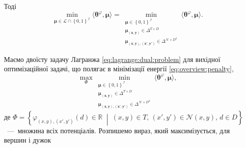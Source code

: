 Тоді
\begin{equation*}
    \min \limits_{\pmb{\mu} \in \mathcal{L} \cap \left\{0, 1 \right\}^{\mathcal{I}}}
        \langle \pmb{\theta}^{\varphi}, \pmb{\mu} \rangle =
    \min \limits_{\substack{\pmb{\mu} \in \left\{ 0, 1 \right\}^{\mathcal{I}} \\
                            \pmb{\mu_{\left(x, y \right)}} \in \Delta^{T \times D} \\
                            \pmb{\mu_{\left(x, y \right), \left(x', y' \right)}} \in
                                \Delta^{\mathcal{N} \times D^2}}}
        \langle \pmb{\theta}^{\varphi}, \pmb{\mu} \rangle.
\end{equation*}

Маємо двоїсту задачу Лагранжа \eqref{eq:lagrange:dual:problem}
для вихідної оптимізаційної задачі,
що полягає в мінімізації енергії \eqref{eq:overview:penalty},
\begin{equation*}
    \max \limits_{\Phi}
        \min \limits_{\substack{\pmb{\mu} \in \left\{ 0, 1 \right\}^{\mathcal{I}} \\
                                \pmb{\mu_{\left(x, y \right)}} \in \Delta^{T \times D} \\
                                \pmb{\mu_{\left(x, y \right), \left(x', y' \right)}} \in
                                    \Delta^{\mathcal{N} \times D^2}}}
            \langle \pmb{\theta}^{\varphi}, \pmb{\mu} \rangle,
\end{equation*}
де
$\Phi = \left\{
    \varphi_{\left(x, y \right), \left(x', y' \right)} \left(
        d
    \right) \in \mathbb{R} \; \middle| \;
    \left(x, y \right) \in T, \,
    \left(x', y' \right) \in \mathcal{N} \left(x, y \right), \,
    d \in D
\right\}$~---~множина всіх потенціалів.
Розпишемо вираз, який максимізується, для вершин і дужок
